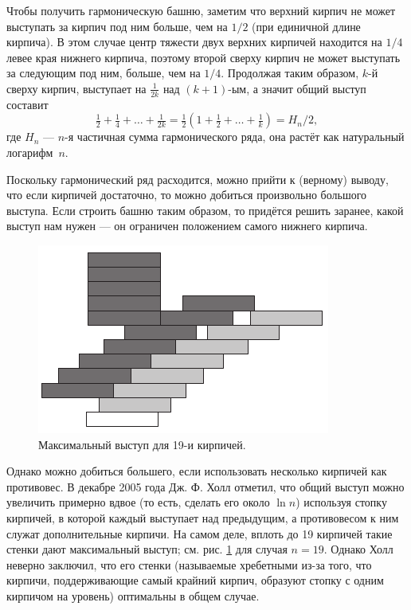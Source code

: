 Чтобы получить гармоническую башню, заметим что верхний кирпич не может выступать за  кирпич под ним больше, чем на $1/2$ (при единичной длине кирпича).
В этом случае центр тяжести двух верхних кирпичей находится на $1/4$ левее края нижнего кирпича, поэтому второй сверху кирпич не может выступать за следующим под ним, больше, чем на $1/4$.
Продолжая таким образом, $k$-й сверху кирпич, выступает на $\tfrac1{2k}$ над $(k + 1)$-ым, а значит общий выступ составит 
\[\tfrac12+\tfrac14+\dots+\tfrac1{2k}=\tfrac12(1+\tfrac12+\dots+\tfrac1k)=H_n/2,\]
где $H_n$ --- $n$-я частичная сумма гармонического ряда, она растёт как натуральный логарифм~$n$.

Поскольку гармонический ряд расходится, можно прийти к (верному) выводу, что если кирпичей достаточно, то можно добиться произвольно большого выступа.
Если строить башню таким образом, то придётся решить заранее, какой выступ нам нужен --- он ограничен положением самого нижнего кирпича.

\begin{figure}[htb!]
\centering
\includegraphics[scale=1]{pics/kirpich2}
\caption{Максимальный выступ для 19-и кирпичей.}
\label{pic:kirpich2}
\end{figure}

Однако можно добиться большего, если использовать несколько кирпичей как противовес.
В декабре 2005 года Дж. Ф. Холл \cite{35} отметил, что общий выступ можно увеличить примерно вдвое (то есть, сделать его около $\ln n$) используя стопку кирпичей, в которой каждый выступает над предыдущим, а противовесом к ним служат дополнительные кирпичи. %
На самом деле, вплоть до 19 кирпичей такие стенки дают максимальный выступ; см. рис. \ref{pic:kirpich2} для случая $n = 19$.
Однако Холл неверно заключил, что его стенки (называемые хребетными из-за того, что кирпичи, поддерживающие самый крайний кирпич, образуют стопку с одним кирпичом на уровень) оптимальны в общем случае.

